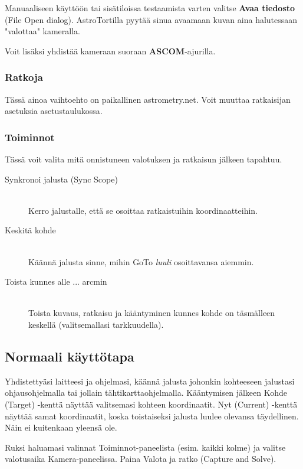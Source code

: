 \documentclass{article}
\begin{document}
Manuaaliseen käyttöön tai sisätiloissa testaamista varten valitse \textbf{Avaa tiedosto} (File Open dialog). AstroTortilla pyytää sinua avaamaan kuvan aina halutessaan "valottaa" kameralla.

Voit lisäksi yhdistää kameraan suoraan \textbf{ASCOM}-ajurilla.

\subsubsection{Ratkoja}

Tässä ainoa vaihtoehto on paikallinen astrometry.net. Voit muuttaa ratkaisijan asetuksia asetustaulukossa.

\subsubsection{Toiminnot}

Tässä voit valita mitä onnistuneen valotuksen ja ratkaisun jälkeen tapahtuu.
\begin{description}
\item[Synkronoi jalusta (Sync Scope)] \hfill \\
Kerro jalustalle, että se osoittaa ratkaistuihin koordinaatteihin.
\item[Keskitä kohde] \hfill \\
Käännä jalusta sinne, mihin GoTo \emph{luuli} osoittavansa aiemmin.
\item[Toista kunnes alle ... arcmin ] \hfill \\
Toista kuvaus, ratkaisu ja kääntyminen kunnes kohde on täsmälleen keskellä (valitsemallasi tarkkuudella).
\end{description}

\subsection{Normaali käyttötapa}

Yhdistettyäsi laitteesi ja ohjelmasi, käännä jalusta johonkin kohteeseen 
jalustasi ohjausohjelmalla tai jollain tähtikarttaohjelmalla.
Kääntymisen jälkeen Kohde (Target) -kenttä näyttää valitsemasi kohteen koordinaatit. Nyt (Current) -kenttä näyttää samat koordinaatit,
koska toistaiseksi jalusta luulee olevansa täydellinen. Näin ei kuitenkaan yleensä ole.

Ruksi haluamasi valinnat Toiminnot-paneelista (esim. kaikki kolme) ja valitse valotusaika Kamera-paneelissa.
Paina Valota ja ratko (Capture and Solve).
\end{document}
